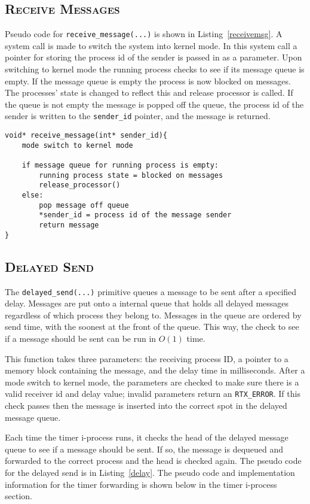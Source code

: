 \documentclass[oneside]{report}
\begin{document}
\subsection{\textsc{Receive Messages}}
Pseudo code for \texttt{receive\_message(...)} is shown in
Listing~\ref{receivemsg}. A system call is made to switch the system
into kernel mode. In this system call a pointer for storing the
process id of the sender is passed in as a parameter. Upon switching
to kernel mode the running process checks to see if its message queue
is empty. If the message queue is empty the process is now blocked on
messages. The processes' state is changed to reflect this and release
processor is called. If the queue is not empty the message is popped
off the queue, the process id of the sender is written to the
\texttt{sender\_id} pointer, and the message is returned.

\begin{lstlisting}
void* receive_message(int* sender_id){
    mode switch to kernel mode

    if message queue for running process is empty:
        running process state = blocked on messages
        release_processor()
    else:
        pop message off queue
        *sender_id = process id of the message sender
        return message      
}
\end{lstlisting}

\subsection{\textsc{Delayed Send}}
The \texttt{delayed\_send(...)} primitive queues a message to be sent
after a specified delay. Messages are put onto a internal queue that
holds all delayed messages regardless of which process they belong to.
Messages in the queue are ordered by send time, with the soonest at
the front of the queue. This way, the check to see if a message should
be sent can be run in $O(1)$ time.

This function takes three parameters: the receiving process ID, a
pointer to a memory block containing the message, and the delay time
in milliseconds. After a mode switch to kernel mode, the parameters
are checked to make sure there is a valid receiver id and delay value;
invalid parameters return an \texttt{RTX\_ERROR}. If this check passes
then the message is inserted into the correct spot in the delayed
message queue.

Each time the timer i-process runs, it checks the head of the delayed
message queue to see if a message should be sent. If so, the message
is dequeued and forwarded to the correct process and the head is
checked again. The pseudo code for the delayed send is in
Listing~\ref{delay}. The pseudo code and implementation information
for the timer forwarding is shown below in the timer i-process
section.
\end{document}
